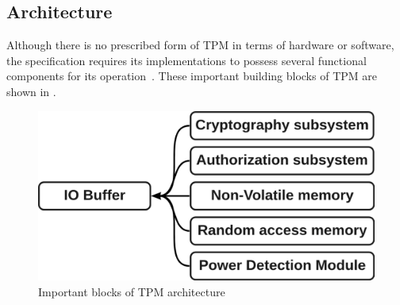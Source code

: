 \subsection{Architecture}
Although there is no prescribed form of TPM in terms of hardware or software, the specification requires its implementations to possess several functional components for its operation~\cite{tcg_p1_architecture}. These important building blocks of TPM are shown in .

\begin{figure}[H]
    \centering
    \includegraphics[width=\textwidth-4.5cm]{img/tpm-arch-diagram.png}
    \caption{Important blocks of TPM architecture}
    \label{fig:tpm-arch-scheme}
\end{figure}

